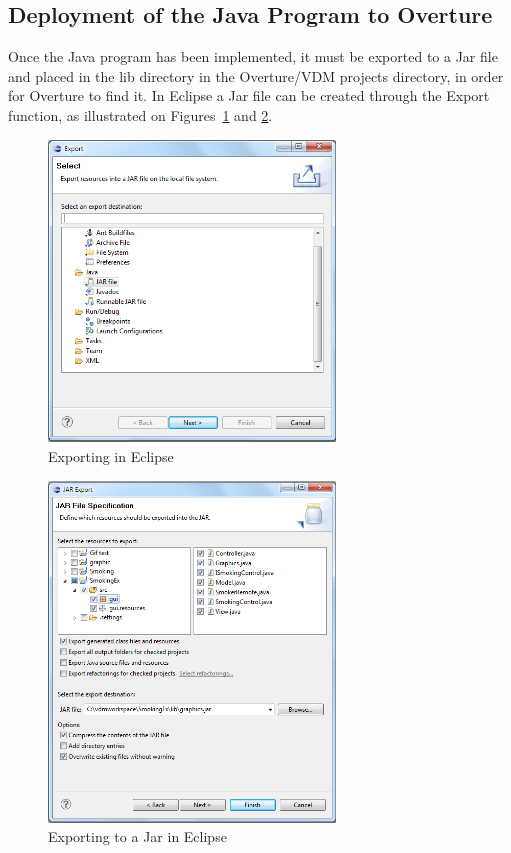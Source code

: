 \documentclass{overturerepchap}
\begin{document}
\subsection{Deployment of the Java Program to Overture}
Once the Java program has been implemented, it must be exported to a Jar file and placed in the lib directory in the Overture/VDM projects directory, in order for Overture to find it.
In Eclipse a Jar file can be created through the Export function, as illustrated on Figures~\ref{fig:gui:EclipseExport} and \ref{fig:gui:JarExport}. 

\begin{figure}[h]
\begin{center}
  \includegraphics[width=3in]{figures/SmokersExport}
  \caption[labelInTOC]{Exporting in Eclipse}
  \label{fig:gui:EclipseExport}
\end{center}
\end{figure}

\begin{figure}[h]
\begin{center}
  \includegraphics[width=3in]{figures/SmokersJarExport}
  \caption[labelInTOC]{Exporting to a Jar in Eclipse}
  \label{fig:gui:JarExport}
\end{center}
\end{figure}
\end{document}

